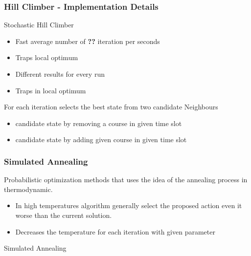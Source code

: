\documentclass{beamer}
\makeatletter
\newenvironment{algorithm}[1][]{%
  \def\@captype{algorithm}%
  \par\nobreak\begin{center}\nobreak}
  {\par\nobreak\end{center}\nobreak}
\newcounter{algorithm}
\makeatother
\begin{document}
\begin{frame}
\frametitle{Hill Climber - Implementation Details}
Stochastic Hill Climber
\begin{itemize}
\item Fast average number of \textbf{??} iteration per seconds
\item Traps local optimum 
\item Different results for every run
\item Traps in local optimum
\end{itemize}
For each iteration selects the best state from two candidate Neighbours
\begin{itemize}
\item candidate state by removing a course in given time slot
\item candidate state by adding given  course in given time slot
\end{itemize}
\end{frame}

\begin{frame}[shrink=20]
\frametitle {Simulated Annealing}
Probabilistic optimization methods that uses the idea of the annealing process in thermodynamic.
\begin{itemize}
\item In high temperatures algorithm generally select the proposed action even it worse than the current solution.
\item Decreases the temperature for each iteration with given parameter
\end{itemize}

\begin{algorithm}[H]
\begin{algorithmic}[1]
\REPEAT
{}
\ENDIF
{}
\end{algorithmic}
\caption{Simulated Annealing }
\label{alg:seq}
\end{algorithm}
\end{frame}
\end{document}
